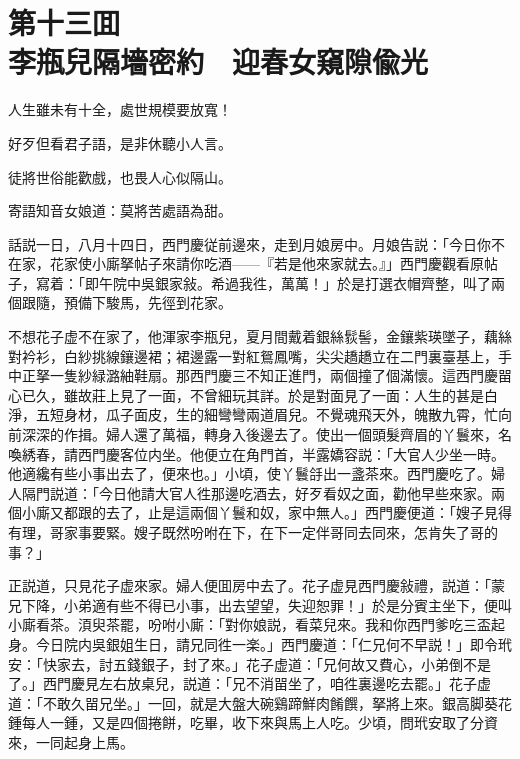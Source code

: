 
\chapter*{第十三囬　\\李瓶兒隔墻密約　迎春女窺隙偸光}


\begin{myquote}
人生雖未有十全，處世規模要放寬！

好歹但看君子語，是非休聽小人言。

徒將世俗能歡戲，也畏人心似隔山。

寄語知音女娘道：莫將苦處語為甜。
\end{myquote}

話説一日，八月十四日，西門慶従前邊來，走到月娘房中。月娘告説：「今日你不在家，花家使小廝拏帖子來請你吃酒——『若是他來家就去。』」西門慶觀看原帖子，寫着：「即午院中吳銀家敍。希過我徃，萬萬！」於是打選衣帽齊整，叫了兩個跟隨，預備下駿馬，先徑到花家。

不想花子虚不在家了，他渾家李瓶兒，夏月間戴着銀絲䯼髻，金鑲紫瑛墜子，藕絲對衿衫，白紗挑線鑲邊裙；裙邊露一對紅鴛鳳嘴，尖尖趫趫立在二門裏臺基上，手中正拏一隻紗緑潞紬鞋扇。那西門慶三不知正進門，兩個撞了個滿懷。這西門慶㽞心已久，雖故莊上見了一面，不曾細玩其詳。於是對面見了一面：人生的甚是白淨，五短身材，瓜子面皮，生的細彎彎兩道眉兒。不覺魂飛天外，魄散九霄，忙向前深深的作揖。婦人還了萬福，轉身入後邊去了。使出一個頭髮齊眉的丫鬟來，名喚綉春，請西門慶客位内坐。他便立在角門首，半露嬌容説：「大官人少坐一時。他適纔有些小事出去了，便來也。」小頃，使丫鬟㧱出一盞茶來。西門慶吃了。婦人隔門説道：「今日他請大官人徃那邊吃酒去，好歹看奴之面，勸他早些來家。兩個小廝又都跟的去了，止是這兩個丫鬟和奴，家中無人。」西門慶便道：「嫂子見得有理，哥家事要緊。嫂子既然吩咐在下，在下一定伴哥同去同來，怎肯失了哥的事？」

正説道，只見花子虚來家。婦人便囬房中去了。花子虚見西門慶敍禮，説道：「蒙兄下降，小弟適有些不得已小事，出去望望，失迎恕罪！」於是分賓主坐下，便叫小廝看茶。湏臾茶罷，吩咐小廝：「對你娘説，看菜兒來。我和你西門爹吃三盃起身。今日院内吳銀姐生日，請兄同徃一楽。」西門慶道：「仁兄何不早説！」即令玳安：「快家去，討五錢銀子，封了來。」花子虚道：「兄何故又費心，小弟倒不是了。」西門慶見左右放桌兒，説道：「兄不消㽞坐了，咱徃裏邊吃去罷。」花子虚道：「不敢久㽞兄坐。」一回，就是大盤大碗鷄蹄鮮肉餚饌，拏將上來。銀高脚葵花鍾每人一鍾，又是四個捲餅，吃畢，收下來與馬上人吃。少頃，問玳安取了分資來，一同起身上馬。

